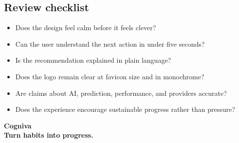 \documentclass[11pt,a4paper]{article}
\begin{document}
\subsection*{Review checklist}
\begin{itemize}
\item Does the design feel calm before it feels clever?
\item Can the user understand the next action in under five seconds?
\item Is the recommendation explained in plain language?
\item Does the logo remain clear at favicon size and in monochrome?
\item Are claims about AI, prediction, performance, and providers accurate?
\item Does the experience encourage sustainable progress rather than pressure?
\end{itemize}

\vfill\begin{center}\color{CognivaForest}\Large\bfseries Cogniva\\[4pt]\normalsize\color{CognivaTeal} Turn habits into progress.
\end{center}
\end{document}
